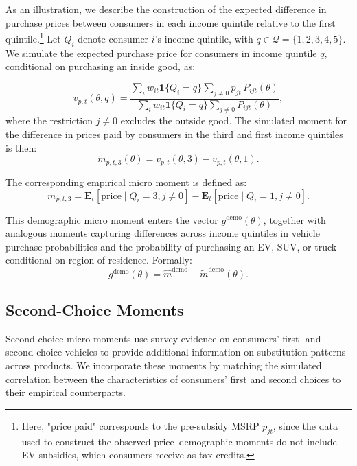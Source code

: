 \documentclass[11pt]{article}
\begin{document}
As an illustration, we describe the construction of the expected difference in purchase prices between consumers in each income quintile relative to the first quintile.\footnote{Here, "price paid" corresponds to the pre-subsidy MSRP \(p_{jt}\), since the data used to construct the observed price–demographic moments do not include EV subsidies, which consumers receive as tax credits.} Let \(Q_i\) denote consumer \(i\)’s income quintile, with \(q \in \mathcal{Q} = \{1,2,3,4,5\}\). We simulate the expected purchase price for consumers in income quintile \(q\), conditional on purchasing an inside good, as:


\begin{equation}
    v_{p,t}(\theta, q)
    =
    \frac{
        \sum_{i} w_{it} \mathbf{1}\{Q_i = q\}
        \sum_{j \neq 0} p_{jt}\,P_{ijt}(\theta)
    }{
        \sum_{i} w_{it} \mathbf{1}\{Q_i = q\}
        \sum_{j \neq 0} P_{ijt}(\theta)
    },
\end{equation}
where the restriction \(j \neq 0\) excludes the outside good. The simulated moment for the difference in prices paid by consumers in the third and first income quintiles is then:
\begin{equation}
    \tilde{m}_{p,t,3}(\theta)
    =
    v_{p,t}(\theta,3)
    -
    v_{p,t}(\theta,1).
\end{equation}

The corresponding empirical micro moment is defined as:
\begin{equation}
    m_{p,t,3}
    =
    \mathbf{E}_t[\text{price} \mid Q_i = 3, j \neq 0]
    -
    \mathbf{E}_t[\text{price} \mid Q_i = 1, j \neq 0].
\end{equation}

This demographic micro moment enters the vector \(g^{\text{demo}}(\theta)\), together with analogous moments capturing differences across income quintiles in vehicle purchase probabilities and the probability of purchasing an EV, SUV, or truck conditional on region of residence. Formally:
\begin{equation}
    g^{\text{demo}}(\theta)
    =
    \hat{m}^{\text{demo}}
    -
    \tilde{m}^{\text{demo}}(\theta).
\end{equation}

\subsection{Second-Choice Moments}
Second-choice micro moments use survey evidence on consumers’ first- and second-choice vehicles to provide additional information on substitution patterns across products. We incorporate these moments by matching the simulated correlation between the characteristics of consumers’ first and second choices to their empirical counterparts.
\end{document}
